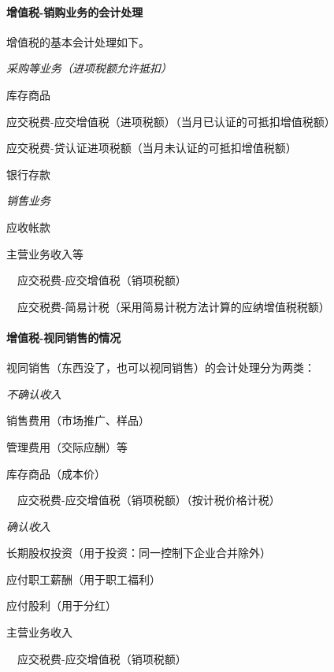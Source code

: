 \documentclass[UTF8,12pt]{ctexart}
\newenvironment{Dr}{%
	\begin{list}{}%
		{
			\setlength{\leftmargin}{2em}
			\setlength{\labelwidth}{2em}
			\setlength{\labelsep}{0pt}
			\setlength{\itemindent}{0pt}
			\setlength{\listparindent}{0pt}
			\setlength{\parsep}{0pt}
			\setlength{\topsep}{0pt}
		}
		\item[\textbf{借：}]
	}{%
	\end{list}
}
\newenvironment{Cr}{%
	\begin{list}{}%
		{
			\setlength{\leftmargin}{2em}
			\setlength{\labelwidth}{2em}
			\setlength{\labelsep}{0pt}
			\setlength{\itemindent}{0pt}
			\setlength{\listparindent}{0pt}
			\setlength{\parsep}{0pt}
			\setlength{\topsep}{0pt}
		}
		\item[\textbf{贷：}]
	}{%
	\end{list}
}
\numberwithin{equation}{section} %
\numberwithin{figure}{section}
\numberwithin{table}{section}
\begin{document}
	\paragraph{增值税-销购业务的会计处理}
	增值税的基本会计处理如下。
	
	\textit{采购等业务（进项税额允许抵扣）}
	
	\begin{Dr}
		库存商品
		
		应交税费-应交增值税（进项税额）（当月已认证的可抵扣增值税额）
		
		应交税费-贷认证进项税额（当月未认证的可抵扣增值税额）
	\end{Dr}
	\begin{Cr}
		银行存款
	\end{Cr}
	
	\textit{销售业务}
	
	\begin{Dr}
		应收帐款
	\end{Dr}
	\begin{Cr}
		主营业务收入等
		
		\ \ 应交税费-应交增值税（销项税额）
		
		\ \ 应交税费-简易计税（采用简易计税方法计算的应纳增值税税额）
	\end{Cr}
	
	\paragraph{增值税-视同销售的情况}视同销售（东西没了，也可以视同销售）的会计处理分为两类：
	
	\textit{不确认收入}
	
	\begin{Dr}
		销售费用（市场推广、样品）
		
		管理费用（交际应酬）等
	\end{Dr}
	\begin{Cr}
		库存商品（成本价）
		
		\ \ 应交税费-应交增值税（销项税额）（按计税价格计税）
	\end{Cr}

	
	\textit{确认收入}
	
	\begin{Dr}
		长期股权投资（用于投资：同一控制下企业合并除外）
		
		应付职工薪酬（用于职工福利）
		
		应付股利（用于分红）
	\end{Dr}
	\begin{Cr}
		主营业务收入
		
		\ \ 应交税费-应交增值税（销项税额）
	\end{Cr}
	
\end{document}
